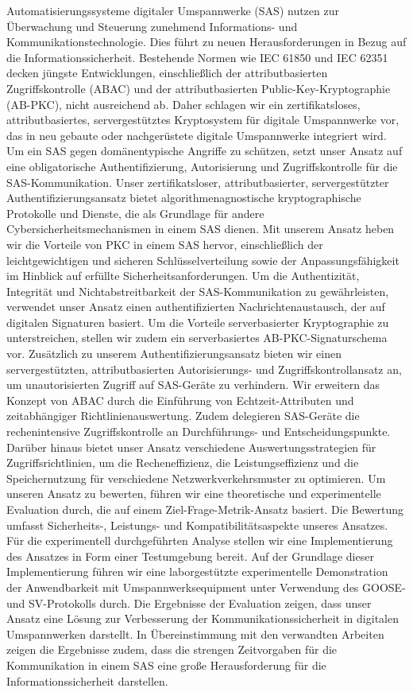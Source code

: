 \Abstract
Automatisierungssysteme digitaler Umspannwerke (SAS) nutzen zur Überwachung und Steuerung zunehmend Informations- und Kommunikationstechnologie.
Dies führt zu neuen Herausforderungen in Bezug auf die Informationssicherheit.
Bestehende Normen wie IEC 61850 und IEC 62351 decken jüngste Entwicklungen, einschließlich der attributbasierten Zugriffskontrolle (ABAC) und der attributbasierten Public-Key-Kryptographie (AB-PKC), nicht ausreichend ab.
Daher schlagen wir ein zertifikatsloses, attributbasiertes, servergestütztes Kryptosystem für digitale Umspannwerke vor, das in neu gebaute oder nachgerüstete digitale Umspannwerke integriert wird.
Um ein SAS gegen domänentypische Angriffe zu schützen, setzt unser Ansatz auf eine obligatorische Authentifizierung, Autorisierung und Zugriffskontrolle für die SAS-Kommunikation.
Unser zertifikatsloser, attributbasierter, servergestützter Authentifizierungsansatz bietet algorithmenagnostische kryptographische Protokolle und Dienste, die als Grundlage für andere Cybersicherheitsmechanismen in einem SAS dienen.
Mit unserem Ansatz heben wir die Vorteile von PKC in einem SAS hervor, einschließlich der leichtgewichtigen und sicheren Schlüsselverteilung sowie der Anpassungsfähigkeit im Hinblick auf erfüllte Sicherheitsanforderungen.
Um die Authentizität, Integrität und Nichtabstreitbarkeit der SAS-Kommunikation zu gewährleisten, verwendet unser Ansatz einen authentifizierten Nachrichtenaustausch, der auf digitalen Signaturen basiert.
Um die Vorteile serverbasierter Kryptographie zu unterstreichen, stellen wir zudem ein serverbasiertes AB-PKC-Signaturschema vor.
Zusätzlich zu unserem Authentifizierungsansatz bieten wir einen servergestützten, attributbasierten Autorisierungs- und Zugriffskontrollansatz an, um unautorisierten Zugriff auf SAS-Geräte zu verhindern.
Wir erweitern das Konzept von ABAC durch die Einführung von Echtzeit-Attributen und zeitabhängiger Richtlinienauswertung.
Zudem delegieren SAS-Geräte die rechenintensive Zugriffskontrolle an Durchführungs- und Entscheidungspunkte.
Darüber hinaus bietet unser Ansatz verschiedene Auswertungsstrategien für Zugriffsrichtlinien, um die Recheneffizienz, die Leistungseffizienz und die Speichernutzung für verschiedene Netzwerkverkehrsmuster zu optimieren.
Um unseren Ansatz zu bewerten, führen wir eine theoretische und experimentelle Evaluation durch, die auf einem Ziel-Frage-Metrik-Ansatz basiert.
Die Bewertung umfasst Sicherheits-, Leistungs- und Kompatibilitätsaspekte unseres Ansatzes.
Für die experimentell durchgeführten Analyse stellen wir eine Implementierung des Ansatzes in Form einer Testumgebung bereit.
Auf der Grundlage dieser Implementierung führen wir eine laborgestützte experimentelle Demonstration der Anwendbarkeit mit Umspannwerksequipment unter Verwendung des GOOSE- und SV-Protokolls durch.
Die Ergebnisse der Evaluation zeigen, dass unser Ansatz eine Lösung zur Verbesserung der Kommunikationssicherheit in digitalen Umspannwerken darstellt.
In Übereinstimmung mit den verwandten Arbeiten zeigen die Ergebnisse zudem, dass die strengen Zeitvorgaben für die Kommunikation in einem SAS eine große Herausforderung für die Informationssicherheit darstellen.
